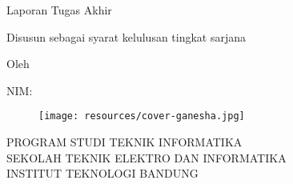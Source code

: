 \clearpage
\pagestyle{empty}

\begin{center}
\smallskip

    \Large \bfseries \MakeUppercase{\thetitle}
    \vfill

    \Large Laporan Tugas Akhir
    \vfill

    \large Disusun sebagai syarat kelulusan tingkat sarjana
    \vfill

    \large Oleh

    \Large \theauthor

    \Large NIM: \thestudentnumber

    \vfill
    \begin{figure}[h]
        \centering
      	\texttt{[image: resources/cover-ganesha.jpg]}
    \end{figure}
    \vfill

    \Large
    \uppercase{
        Program Studi Teknik Informatika \\
        Sekolah Teknik Elektro dan Informatika \\
        Institut Teknologi Bandung
    }

    \thedatemy

\end{center}

\clearpage
